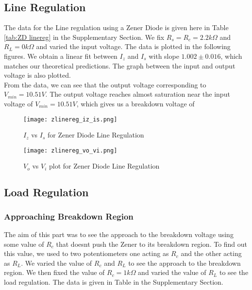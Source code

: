 \documentclass{scrartcl}
\newcommand{\1}{\mathbbm{1}}
\begin{document}
\subsection{Line Regulation}
The data for the Line regulation using a Zener Diode is given here in Table \ref{tab:ZD linereg} in the Supplementary Section.
We fix $R_s=R_c =2.2 k\Omega$ and $R_L = 0 k\Omega$ and varied the input voltage. The data is plotted in the following figures.
We obtain a linear fit between $I_z$ and $I_s$ with slope $\pmb{1.002 \pm 0.016}$, which matches our theoretical predictions.
The graph between the input and output voltage is also plotted. \\

From the data, we can see that the output voltage corresponding to $V_{min} = 10.51 V$. 
The output voltage reaches almost saturation near
the input voltage of $V_{min}=10.51V$, which gives us a breakdown voltage of \\
\begin{center}\end{center}

\begin{figure}[H]
	\centering
	\texttt{[image: zlinereg\_iz\_is.png]}
	\caption{$I_z$ vs $I_s$ for Zener Diode Line Regulation}
\end{figure}
\begin{figure}[H]
	\centering
	\texttt{[image: zlinereg\_vo\_vi.png]}
	\caption{$V_o$ vs $V_i$ plot for  Zener Diode Line Regulation}
\end{figure}
\subsection{Load Regulation}


\subsubsection{Approaching Breakdown Region}
The aim of this part was to see the approach to the breakdown voltage using some value of 
$R_c$ that doesnt push the Zener to its breakdown region. To find out this value, we used to two potentiometers
one acting as $R_c$ and the other acting as $R_L$. We varied the value of $R_c$ and $R_L$ to see the approach to the breakdown region.
We then fixed the value of $R_c=1k\Omega$ and varied the value of $R_L$ to see the load regulation. The data is given in Table \label{tab:ZDload1ohm} in the Supplementary Section.
\end{document}
